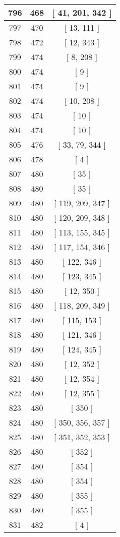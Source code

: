 \begin{center}
\begin{longtable}[H]{|| c c c ||}
796 & 468 & [ 41, 201, 342 ]
\\\hline
797 & 470 & [ 13, 111 ]
\\\hline
798 & 472 & [ 12, 343 ]
\\\hline
799 & 474 & [ 8, 208 ]
\\\hline
800 & 474 & [ 9 ]
\\\hline
801 & 474 & [ 9 ]
\\\hline
802 & 474 & [ 10, 208 ]
\\\hline
803 & 474 & [ 10 ]
\\\hline
804 & 474 & [ 10 ]
\\\hline
805 & 476 & [ 33, 79, 344 ]
\\\hline
806 & 478 & [ 4 ]
\\\hline
807 & 480 & [ 35 ]
\\\hline
808 & 480 & [ 35 ]
\\\hline
809 & 480 & [ 119, 209, 347 ]
\\\hline
810 & 480 & [ 120, 209, 348 ]
\\\hline
811 & 480 & [ 113, 155, 345 ]
\\\hline
812 & 480 & [ 117, 154, 346 ]
\\\hline
813 & 480 & [ 122, 346 ]
\\\hline
814 & 480 & [ 123, 345 ]
\\\hline
815 & 480 & [ 12, 350 ]
\\\hline
816 & 480 & [ 118, 209, 349 ]
\\\hline
817 & 480 & [ 115, 153 ]
\\\hline
818 & 480 & [ 121, 346 ]
\\\hline
819 & 480 & [ 124, 345 ]
\\\hline
820 & 480 & [ 12, 352 ]
\\\hline
821 & 480 & [ 12, 354 ]
\\\hline
822 & 480 & [ 12, 355 ]
\\\hline
823 & 480 & [ 350 ]
\\\hline
824 & 480 & [ 350, 356, 357 ]
\\\hline
825 & 480 & [ 351, 352, 353 ]
\\\hline
826 & 480 & [ 352 ]
\\\hline
827 & 480 & [ 354 ]
\\\hline
828 & 480 & [ 354 ]
\\\hline
829 & 480 & [ 355 ]
\\\hline
830 & 480 & [ 355 ]
\\\hline
831 & 482 & [ 4 ]
\\\hline

\end{longtable}
\end{center}
